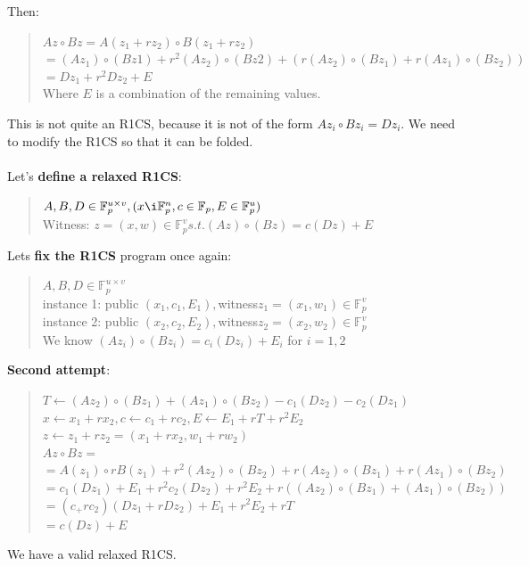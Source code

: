 Then:
\begin{quote}
    $Az \circ Bz = A(z_1 + r z_2) \circ B(z_1 + rz_2)$
    \\
    $= (Az_1) \circ (Bz1) + r^2 (Az_2) \circ (Bz2) + (r(Az_2) \circ (Bz_1) + r(Az_1) \circ (Bz_2))$
    \\
    $=Dz_1 + r^2Dz_2 + E$ 
    \\
    Where $E$ is a combination of the remaining values.
    \\
\end{quote}
This is not quite an R1CS, because it is not of the form $Az_i \circ Bz_i = Dz_i$.
We need to modify the R1CS so that it can be folded. 
\\
\\
Let's \textbf{define a relaxed R1CS}: 
\begin{quote}
$A, B,D \in \mathbb{F}^{u \times v}_p, (x \i  \mathbb{F}^n_p, c \in \mathbb{F}_p, E \in \mathbb{F}^u_p) $
\\
Witness: $ z = (x,w) \in \mathbb{F}^v_p s.t. (Az) \circ (Bz) = c(Dz) + E$
\end{quote}
Lets \textbf{fix the R1CS} program once again:
\begin{quote}
$A,B,D \in \mathbb{F}^{u \times v}_p $
\\
instance 1: public $ (x_1,c_1,E_1), $witness$ z_1 = (x_1, w_1) \in \mathbb{F}^v_p$
\\
instance 2: public $(x_2,c_2,E_2), $witness$  z_2 = (x_2, w_2) \in \mathbb{F}^v_p$
\\
We know $(Az_i) \circ (Bz_i) = c_i(Dz_i) + E_i$ for $ i = 1,2$
\end{quote}

\textbf{Second attempt}:
\begin{quote}
$T \leftarrow (Az_2) \circ (Bz_1) + (Az_1) \circ (Bz_2) - c_1(Dz_2) - c_2(Dz_1)$
\\
$x \leftarrow x_1 + rx_2, c \leftarrow c_1 + rc_2, E \leftarrow E_1 + rT +r^2E_2$
\\
$z \leftarrow z_1 + rz_2 = (x_1 +rx_2, w_1 + rw_2)$
\\
$Az \circ Bz = $
\\
$=A(z_1) \circ rB(z_1) +r^2(Az_2) \circ (Bz_2) + r(Az_2) \circ (Bz_1) + r(Az_1) \circ (Bz_2)$
\\
$=c_1(Dz_1) + E_1 + r^2c_2(Dz_2) + r^2E_2+r((Az_2) \circ (Bz_1) + (Az_1) \circ (Bz_2))$
\\
$=(c_+rc_2)(Dz_1+rDz_2)+E_1+r^2E_2+rT$
\\
$=c(Dz) + E$
\end{quote}
We have a valid relaxed R1CS.\cite{ZKM10} \cite{FG23}